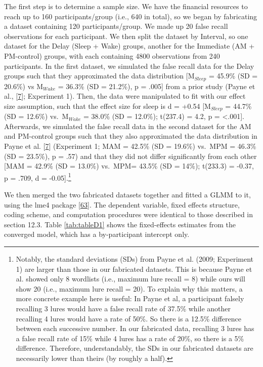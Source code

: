 \documentclass[
]{article}
\begin{document}
The first step is to determine a sample size. We have the financial resources to reach up to 160 participants/group (i.e., 640 in total), so we began by fabricating a dataset containing 120 participants/group. We made up 20 false recall observations for each participant. We then split the dataset by Interval, so one dataset for the Delay (Sleep + Wake) groups, another for the Immediate (AM + PM-control) groups, with each containing 4800 observations from 240 participants. In the first dataset, we simulated the false recall data for the Delay groups such that they approximated the data distribution {[}M\(_{Sleep}\) = 45.9\% (SD = 20.6\%) vs M\(_{Wake}\) = 36.3\% (SD = 21.2\%), p = .005{]} from a prior study (Payne et al., {[}\protect\hyperlink{ref-payne2009a}{7}{]}; Experiment 1). Then, the data were manipulated to fit with our effect size assumption, such that the effect size for sleep is d = +0.54 {[}M\(_{Sleep}\) = 44.7\% (SD = 12.6\%) vs.~M\(_{Wake}\) = 38.0\% (SD = 12.0\%); t(237.4) = 4.2, p = \textless.001{]}. Afterwards, we simulated the false recall data in the second dataset for the AM and PM-control groups such that they also approximated the data distribution in Payne et al. {[}\protect\hyperlink{ref-payne2009a}{7}{]} (Experiment 1; MAM = 42.5\% (SD = 19.6\%) vs.~MPM = 46.3\% (SD = 23.5\%), p = .57) and that they did not differ significantly from each other {[}MAM = 42.9\% (SD = 13.0\%) vs.~MPM= 43.5\% (SD = 14\%); t(233.3) = -0.37, p = .709, d = -0.05{]}.\footnote{Notably, the standard deviations (SDs) from Payne et al. (2009; Experiment 1) are larger than those in our fabricated datasets. This is because Payne et al. showed only 8 wordlists (i.e., maximum lure recall = 8) while ours will show 20 (i.e., maximum lure recall = 20). To explain why this matters, a more concrete example here is useful: In Payne et al, a participant falsely recalling 3 lures would have a false recall rate of 37.5\% while another recalling 4 lures would have a rate of 50\%. So there is a 12.5\% difference between each successive number. In our fabricated data, recalling 3 lures has a false recall rate of 15\% while 4 lures has a rate of 20\%, so there is a 5\% difference. Therefore, understandably, the SDs in our fabricated datasets are necessarily lower than theirs (by roughly a half).}

We then merged the two fabricated datasets together and fitted a GLMM to it, using the lme4 package {[}\protect\hyperlink{ref-bates2015a}{63}{]}. The dependent variable, fixed effects structure, coding scheme, and computation procedures were identical to those described in section 12.3. Table \ref{tab:tableD1} shows the fixed-effects estimates from the converged model, which has a by-participant intercept only.
\end{document}
